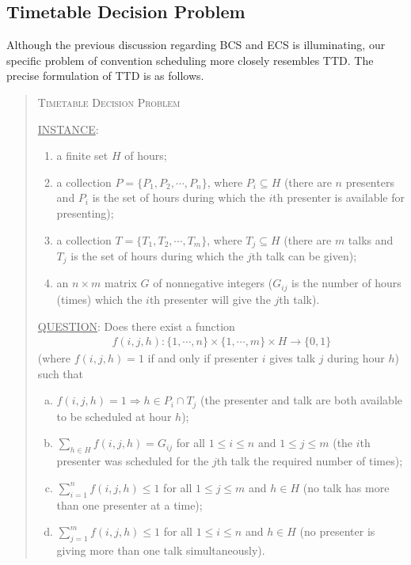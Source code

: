 \documentclass[]{article}
\theoremstyle{definition}
\theoremstyle{remark}
\numberwithin{equation}{section}
\begin{document}
\subsection{Timetable Decision Problem}
Although the previous discussion regarding BCS and ECS is illuminating, our specific problem of convention scheduling more closely resembles TTD. The precise formulation of TTD is as follows.
\begin{quote}
	\textsc{Timetable Decision Problem}
	
	\underline{INSTANCE}:
	\begin{enumerate}
		\item a finite set $H$ of hours;
		\item a collection $P = \{P_1, P_2, \cdots, P_n\}$, where $P_i \subseteq H$ (there are $n$ presenters and $P_i$ is the set of hours during which the $i$th presenter is available for presenting);
		\item a collection $T = \{T_1, T_2, \cdots, T_m\}$, where $T_j \subseteq H$ (there are $m$ talks and $T_j$ is the set of hours during which the $j$th talk can be given);
		\item an $n \times m$ matrix $G$ of nonnegative integers ($G_{ij}$ is the number of hours (times) which the $i$th presenter will give the $j$th talk).
	\end{enumerate}
	\underline{QUESTION}: Does there exist a function 
	\begin{gather*}
		f(i,j,h) : \{1,\cdots,n\} \times \{1,\cdots,m\} \times H \rightarrow \{0,1\}
	\end{gather*}
	(where $f(i,j,h)=1$ if and only if presenter $i$ gives talk $j$ during hour $h$) such that
	\begin{enumerate}[(a)]
		\item $f(i,j,h) = 1 \Rightarrow h \in P_i \cap T_j$ (the presenter and talk are both available to be scheduled at hour $h$);
		\item $\sum\limits_{h \in H} f(i,j,h) = G_{ij}$ for all $1 \le i \le n$ and $1 \le j \le m$ (the $i$th presenter was scheduled for the $j$th talk the required number of times);
		\item $\sum\limits_{i=1}^n f(i,j,h) \le 1$ for all $1 \le j \le m$ and $h \in H$ (no talk has more than one presenter at a time);
		\item $\sum\limits_{j=1}^m f(i,j,h) \le 1$ for all $1 \le i \le n$ and $h \in H$ (no presenter is giving more than one talk simultaneously).
	\end{enumerate}
\end{quote}
\end{document}
